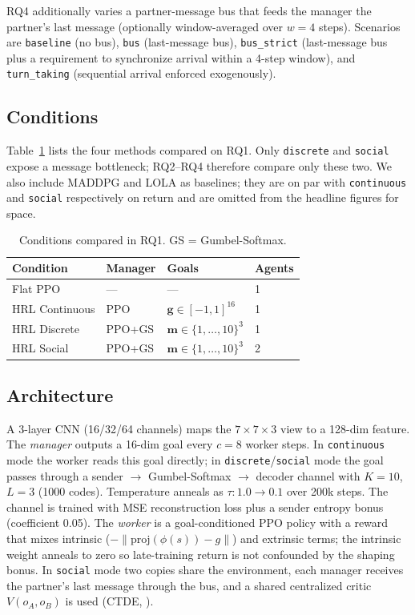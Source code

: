 \documentclass{article}
\begin{document}
RQ4 additionally varies a partner-message bus that feeds the manager the
partner's last message (optionally window-averaged over $w=4$ steps).
Scenarios are \texttt{baseline} (no bus), \texttt{bus} (last-message
bus), \texttt{bus\_strict} (last-message bus plus a requirement to
synchronize arrival within a 4-step window), and \texttt{turn\_taking}
(sequential arrival enforced exogenously).

\subsection{Conditions}

Table~\ref{tab:conditions} lists the four methods compared on RQ1. Only
\texttt{discrete} and \texttt{social} expose a message bottleneck; RQ2--RQ4
therefore compare only these two. We also include MADDPG and LOLA as
baselines; they are on par with \texttt{continuous} and \texttt{social}
respectively on return and are omitted from the headline figures for space.

\begin{table}[h]
\centering
\small
\caption{Conditions compared in RQ1. GS = Gumbel-Softmax.}
\label{tab:conditions}
\begin{tabular}{@{}llll@{}}
\toprule
Condition & Manager & Goals & Agents \\
\midrule
Flat PPO        & ---     & ---                             & 1 \\
HRL Continuous  & PPO     & $\mathbf{g}\in[-1,1]^{16}$      & 1 \\
HRL Discrete    & PPO+GS  & $\mathbf{m}\in\{1,\dots,10\}^3$ & 1 \\
HRL Social      & PPO+GS  & $\mathbf{m}\in\{1,\dots,10\}^3$ & 2 \\
\bottomrule
\end{tabular}
\end{table}

\subsection{Architecture}

A 3-layer CNN (16/32/64 channels) maps the $7 \times 7 \times 3$ view to a
128-dim feature. The \emph{manager} outputs a 16-dim goal every $c=8$
worker steps. In \texttt{continuous} mode the worker reads this goal
directly; in \texttt{discrete}/\texttt{social} mode the goal passes through
a sender $\to$ Gumbel-Softmax $\to$ decoder channel with $K=10$, $L=3$
(1000 codes). Temperature anneals as $\tau: 1.0 \to 0.1$ over 200k steps.
The channel is trained with MSE reconstruction loss plus a sender entropy
bonus (coefficient 0.05). The \emph{worker} is a goal-conditioned PPO
\citep{schulman2017ppo} policy with a reward that mixes intrinsic
($-\|\mathrm{proj}(\phi(s)) - g\|$) and extrinsic terms; the intrinsic
weight anneals to zero so late-training return is not confounded by the
shaping bonus. In \texttt{social} mode two copies share the environment,
each manager receives the partner's last message through the bus, and a
shared centralized critic $V(o_A, o_B)$ is used (CTDE,
\citet{lowe2017maddpg}).
\end{document}
